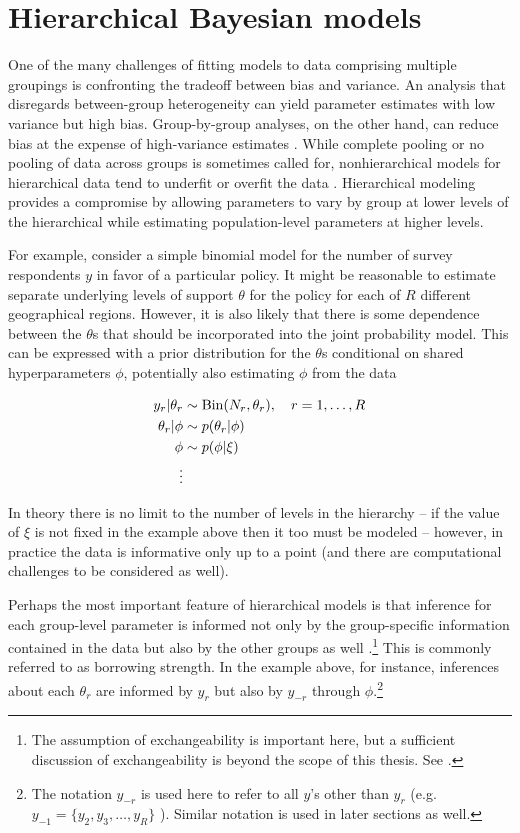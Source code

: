 \section{Hierarchical Bayesian models}
\label{hierarchical}

One of the many challenges of fitting models to data comprising multiple groupings is confronting the tradeoff between bias and variance. An analysis that disregards between-group heterogeneity can yield parameter estimates with low variance but high bias. Group-by-group analyses, on the other hand, can reduce bias at the expense of high-variance estimates . While complete pooling or no pooling of data across groups is sometimes called for, nonhierarchical models for hierarchical data tend to underfit or overfit the data . Hierarchical modeling provides a compromise by allowing parameters to vary by group at lower levels of the hierarchical while estimating population-level parameters at higher levels. 

For example, consider a simple binomial model for the number of survey respondents $y$ in favor of a particular policy. It might be reasonable to estimate separate underlying levels of support $\theta$ for the policy for each of $R$ different geographical regions. However, it is also likely that there is some dependence between the $\theta$s that should be incorporated into the joint probability model. This can be expressed with a prior distribution for the $\theta$s conditional on shared hyperparameters $\phi$, potentially also estimating $\phi$ from the data 

\begin{align*}
y_r | \theta_r &\sim {\rm Bin}(N_r, \theta_r), \quad r = 1, \dots, R \\
\theta_r  | \phi &\sim p(\theta_r | \phi) \\
\phi & \sim p(\phi | \xi)  \\
\vdots
\end{align*}

In theory there is no limit to the number of levels in the hierarchy -- if the value of $\xi$ is not fixed in the example above then it too must be modeled -- however, in practice the data is informative only up to a point (and there are computational challenges to be considered as well). 

Perhaps the most important feature of hierarchical models is that inference for each group-level parameter is informed not only by the group-specific information contained in the data but also by the other groups as well .\footnote{The assumption of exchangeability is important here, but a sufficient discussion of exchangeability is beyond the scope of this thesis. See .} This is commonly referred to as borrowing strength. In the example above, for instance, inferences about each $\theta_r$ are informed by $y_r$ but also by $y_{-r}$ through $\phi$.\footnote{The notation $y_{-r}$ is used here to refer to all $y$'s other than $y_r$ (e.g. $y_{-1} =  \{y_2, y_3, \dots, y_R\}$ ). Similar notation is used in later sections as well. } 

